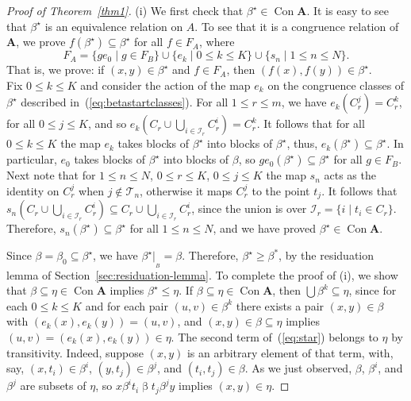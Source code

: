 \documentclass{au}
\numberwithin{equation}{section}
\theoremstyle{plain}
\theoremstyle{definition}
\newcommand{\suchthat}{\ensuremath{\mid}}  %
\newcommand{\defeq}{\ensuremath{=}}        %
\newcommand{\<}{\ensuremath{\langle}}
\renewcommand{\>}{\ensuremath{\rangle}}
\newcommand{\bA}{\ensuremath{\mathbf{A}}}
\newcommand{\sT}{\ensuremath{\mathscr{T}}}
\newcommand{\sI}{\ensuremath{\mathcal{I}}}
\DeclareMathOperator{\Con}{Con}
\renewcommand{\leq}{\ensuremath{\leqslant}}
\renewcommand{\geq}{\ensuremath{\geqslant}}
\newcommand{\resB}{\ensuremath{|_{_B}}}
\begin{document}
\begin{proof}[Proof of Theorem~\ref{thm1}]
(i) 
We first check that $\beta^\star\in \Con\bA$.
 It is
easy to see that $\beta^\star$ is an equivalence relation on $A$.  To see that it
is a congruence relation of $\bA$, we prove $f(\beta^\star) \subseteq \beta^\star$ for
all $f\in F_A$, where
\[
F_A \defeq  \{g e_0 \suchthat g\in F_B\} \cup \{e_k \suchthat 0\leq k \leq K\} \cup \{s_n \suchthat 1 \leq n
\leq N\}.
\]
That is, we prove: if
$(x,y)\in \beta^\star$ and $f\in F_A$, then $(f(x), f(y))\in \beta^\star$.\\[6pt]
Fix $0\leq k \leq K$ and consider the action of the map $e_k$ on the congruence
classes of $\beta^\star$ described in~(\ref{eq:betastartclasses}).  For all $1\leq r \leq
m$, we have $e_k(C_r^j) = C_r^k$, for all $0\leq j\leq K$, and so
$e_k(C_r \cup \bigcup_{i\in \sI_r} C_r^i) = C_r^k$.  It follows that for all $0\leq
k\leq K$ the map $e_k$ takes blocks of $\beta^\star$ into blocks of
$\beta^\star$, thus, $e_k(\beta^\star) \subseteq \beta^\star$.  In
particular, $e_0$ takes blocks of $\beta^\star$ into blocks of $\beta$, so
$g e_0(\beta^\star) \subseteq \beta^\star$ for all $g\in F_B$.  Next note that
for $1\leq n\leq N$, $0\leq r \leq K$, $0\leq j\leq K$ the
map $s_n$ acts as the identity on $C_r^j$ when $j\notin \sT_n$, otherwise it maps
$C_r^j$  to the point $t_j$. It follows that $s_n
(C_r \cup \bigcup_{i\in \sI_r}C_r^i)\subseteq C_r \cup \bigcup_{i\in
  \sI_r}C_r^i$, since the union is over $\sI_r = \{i \mid t_i \in C_r\}$.
Therefore, $s_n(\beta^\star) \subseteq \beta^\star$ for all $1\leq n \leq N$,
and we have proved
$\beta^\star\in \Con\bA$.

Since $\beta = \beta_0 \subseteq \beta^\star$, we have
$\beta^\star \resB = \beta$.
Therefore, $\beta^\star \geq \beta^*$, by the
residuation lemma of Section~\ref{sec:residuation-lemma}.
To complete the proof of (i), we show that
$\beta \subseteq \eta \in \Con \bA$ implies
$\beta^\star\leq \eta$.
If $\beta \subseteq \eta\in \Con \bA$, then $\bigcup \beta^{k} \subseteq
\eta$, since
for each $0\leq k\leq K$ and for each pair
$(u,v)\in \beta^{k}$ there exists a pair $(x,y)\in \beta$ with
$(e_k(x), e_k(y)) = (u,v)$, and $(x,y)\in \beta\subseteq \eta$ implies
$(u,v) = (e_k(x), e_k(y)) \in \eta$.
The second term of~(\ref{eq:star}) belongs to
$\eta$ by transitivity.  Indeed, suppose $(x,y)$ is an arbitrary element of that
term, with, say, $(x, t_i) \in \beta^{i}$, $(y, t_j)\in \beta^{j}$, and $(t_i, t_j) \in
\beta$.  As we just observed, 
$\beta$, $\beta^{i}$,
and $\beta^{j}$ are subsets of $\eta$,
so 
$x \mathrel{\beta^{i}} t_i \mathrel{\beta} t_j \mathrel{\beta^{j}} y$ implies
$(x,y)\in \eta$.


\end{proof}
\end{document}
